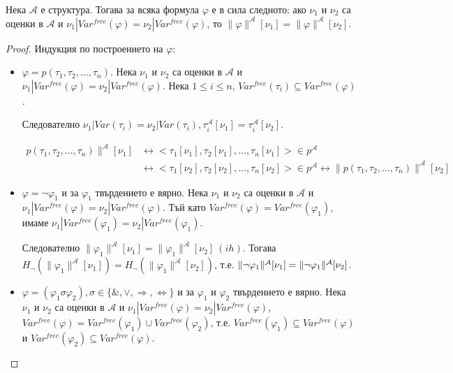 \documentclass{article}
\def\Proofs{1}
\begin{document}
\begin{claim}
Нека $\mathcal{A}$ е структура. Тогава за всяка формула $\varphi$ е в сила следното: ако $\nu_1$ и $\nu_2$ са оценки в $\mathcal{A}$ и $\nu_1 | Var^{free}(\varphi) = \nu_2 | Var^{free}(\varphi)$, то $\|\varphi\|^\mathcal{A}[\nu_1] = \|\varphi\|^\mathcal{A}[\nu_2]$.


\ifcase\Proofs\or
\begin{proof}
Индукция по построението на $\varphi$:

\begin{itemize}
\item $\varphi = p(\tau_1, \tau_2, \ldots, \tau_n)$. Нека $\nu_1$ и $\nu_2$ са оценки в $\mathcal{A}$ и $\nu_1 | Var^{free}(\varphi) = \nu_2 | Var^{free}(\varphi)$. Нека $1 \leq i \leq n$, $Var^{free}(\tau_i) \subseteq Var^{free}(\varphi)$. 

Следователно $\nu_1 | Var(\tau_i) = \nu_2 | Var(\tau_i), \tau_i^\mathcal{A}[\nu_1] = \tau_i^\mathcal{A}[\nu_2]$.

\begin{align*}
p(\tau_1, \tau_2, \ldots, \tau_n)\|^\mathcal{A}[\nu_1] &\longleftrightarrow <\tau_1[\nu_1], \tau_2[\nu_1], \ldots, \tau_n[\nu_1]> \in p^\mathcal{A} \\ &\longleftrightarrow <\tau_1[\nu_2], \tau_2[\nu_2], \ldots, \tau_n[\nu_2]> \in p^\mathcal{A} \longleftrightarrow \|p(\tau_1, \tau_2, \ldots, \tau_n)\|^\mathcal{A}[\nu_2]
\end{align*}

\item $\varphi = \neg\varphi_1$ и за $\varphi_1$ твърдението е вярно. Нека $\nu_1$ и $\nu_2$ са оценки в $\mathcal{A}$ и $\nu_1 | Var^{free}(\varphi) = \nu_2 | Var^{free}(\varphi)$. Тъй като $Var^{free}(\varphi) = Var^{free}(\varphi_1)$, имаме $\nu_1 | Var^{free}(\varphi_1) = \nu_2 | Var^{free}(\varphi_1)$.

Следователно $\|\varphi_1\|^\mathcal{A}[\nu_1] = \|\varphi_1\|^\mathcal{A}[\nu_2]\ (ih)$. Тогава $H_\neg(\|\varphi_1\|^\mathcal{A}[\nu_1]) = H_\neg(\|\varphi_1\|^\mathcal{A}[\nu_2])$, т.е. $\\ \|\neg\varphi_1\|^\mathcal{A}[\nu_1] = \|\neg\varphi_1\|^\mathcal{A}[\nu_2]$.

\item $\varphi = (\varphi_1 \sigma \varphi_2), \sigma \in \{\&, \lor, \Rightarrow, \Leftrightarrow\}$ и за $\varphi_1$ и $\varphi_2$ твърдението е вярно. Нека $\nu_1$ и $\nu_2$ са оценки в $\mathcal{A}$ и $\nu_1 | Var^{free}(\varphi) = \nu_2 | Var^{free}(\varphi)$, $Var^{free}(\varphi) = Var^{free}(\varphi_1) \cup Var^{free}(\varphi_2)$, т.е. $Var^{free}(\varphi_1) \subseteq Var^{free}(\varphi)$ и $Var^{free}(\varphi_2) \subseteq Var^{free}(\varphi)$.


\end{itemize}
\end{proof}
\end{claim}
\end{document}
